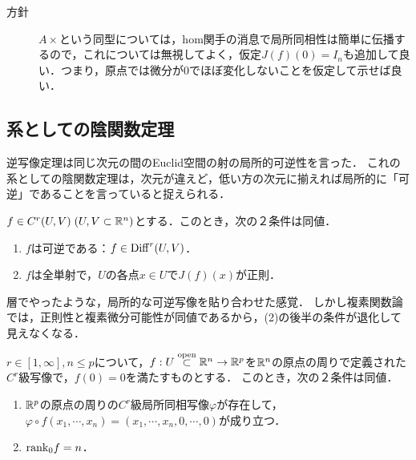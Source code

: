 \documentclass[uplatex,dvipdfmx]{jsreport}
\begin{document}
\begin{remarks}\mbox{}
    \begin{description}
        \item[方針] $A\times$という同型については，hom関手の消息で局所同相性は簡単に伝播するので，これについては無視してよく，仮定$J(f)(0)=I_n$も追加して良い．つまり，原点では微分が$0$でほぼ変化しないことを仮定して示せば良い．
        \item[] 
    \end{description}
\end{remarks}

\subsection{系としての陰関数定理}

\begin{tcolorbox}[colframe=ForestGreen, colback=ForestGreen!10!white,breakable,colbacktitle=ForestGreen!40!white,coltitle=black,fonttitle=\bfseries\sffamily,
title=逆関数定理の系としての陰関数定理]
    逆写像定理は同じ次元の間のEuclid空間の射の局所的可逆性を言った．
    これの系としての陰関数定理は，次元が違えど，低い方の次元に揃えれば局所的に「可逆」であることを言っていると捉えられる．
\end{tcolorbox}

\begin{corollary}
    $f\in C^r(U,V)\;(U,V\subset\mathbb{R}^n)$とする．このとき，次の２条件は同値．
    \begin{enumerate}
        \item $f$は可逆である：$f\in\mathrm{Diff}^r(U,V)$．
        \item $f$は全単射で，$U$の各点$x\in U$で$J(f)(x)$が正則．
    \end{enumerate}
\end{corollary}
\begin{remarks}
    層でやったような，局所的な可逆写像を貼り合わせた感覚．
    しかし複素関数論では，正則性と複素微分可能性が同値であるから，(2)の後半の条件が退化して見えなくなる．
\end{remarks}

\begin{corollary}[陰関数定理]\label{cor-implicit-function}
    $r\in[1,\infty],n\le p$について，$f:U\overset{\mathrm{open}}{\subset}\mathbb{R}^n\to\mathbb{R}^p$を$\mathbb{R}^n$の原点の周りで定義された$C^r$級写像で，$f(0)=0$を満たすものとする．
    このとき，次の２条件は同値．
    \begin{enumerate}
        \item $\mathbb{R}^p$の原点の周りの$C^r$級局所同相写像$\varphi$が存在して，$\varphi\circ f(x_1,\cdots,x_n)=(x_1,\cdots,x_n,0,\cdots,0)$が成り立つ．
        \item $\mathrm{rank}_0f=n$．
    \end{enumerate}
\end{corollary}
\end{document}
